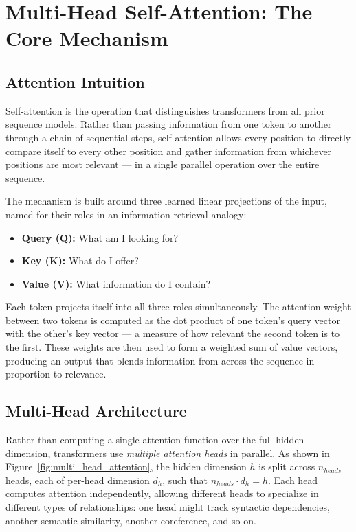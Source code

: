 \documentclass{book}
\begin{document}
\section{Multi-Head Self-Attention: The Core Mechanism}

\subsection{Attention Intuition}

Self-attention is the operation that distinguishes transformers from all
prior sequence models. Rather than passing information from one token to
another through a chain of sequential steps, self-attention allows every
position to directly compare itself to every other position and gather
information from whichever positions are most relevant --- in a single
parallel operation over the entire sequence.

The mechanism is built around three learned linear projections of the input,
named for their roles in an information retrieval analogy:

\begin{itemize}
\item \textbf{Query (Q):} What am I looking for?
\item \textbf{Key (K):} What do I offer?
\item \textbf{Value (V):} What information do I contain?
\end{itemize}

Each token projects itself into all three roles simultaneously. The attention
weight between two tokens is computed as the dot product of one token's query
vector with the other's key vector --- a measure of how relevant the second
token is to the first. These weights are then used to form a weighted sum of
value vectors, producing an output that blends information from across the
sequence in proportion to relevance.

\subsection{Multi-Head Architecture}
\label{sec:multi-head-attention}

Rather than computing a single attention function over the full hidden
dimension, transformers use \emph{multiple attention heads} in parallel.
As shown in Figure~\ref{fig:multi_head_attention}, the hidden dimension $h$ is
split across $n_{heads}$ heads, each of per-head dimension $d_h$, such that
$n_{heads} \cdot d_h = h$. Each head computes attention independently,
allowing different heads to specialize in different types of relationships:
one head might track syntactic dependencies, another semantic similarity,
another coreference, and so on.
\end{document}
